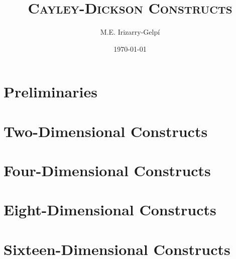 \documentclass[letterpaper, 12pt]{report}
\begin{document}
\title{\textsc{Cayley-Dickson Constructs}}
\author{M.E. Irizarry-Gelp\'{i}}
\date{\today}
\maketitle
\tableofcontents
\part{Preliminaries}


\part{Two-Dimensional Constructs}



\part{Four-Dimensional Constructs}





\part{Eight-Dimensional Constructs}







\part{Sixteen-Dimensional Constructs}









\end{document}
